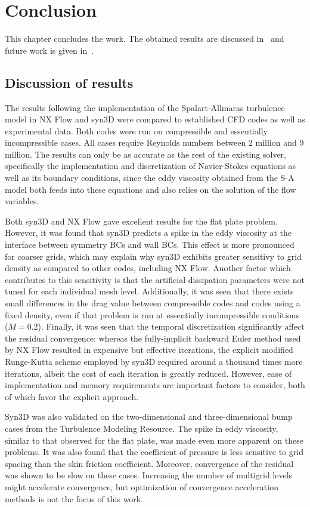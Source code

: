 \chapter{Conclusion}
This chapter concludes the work. The obtained results are discussed in~ and future work is given in~.

\section{Discussion of results}
\label{sec:conclusionresults}
The results following the implementation of the Spalart-Allmaras turbulence model in NX Flow and syn3D were compared to established CFD codes as well as experimental data. Both codes were run on compressible and essentially incompressible cases. All cases require Reynolds numbers between 2 million and 9 million. The results can only be as accurate as the rest of the existing solver, specifically the implementation and discretization of Navier-Stokes equations as well as its boundary conditions, since the eddy viscosity obtained from the S-A model both feeds into these equations and also relies on the solution of the flow variables.

Both syn3D and NX Flow gave excellent results for the flat plate problem. However, it was found that syn3D predicts a spike in the eddy viscosity at the interface between symmetry BCs and wall BCs. This effect is more pronounced for coarser grids, which may explain why syn3D exhibits greater sensitivy to grid density as compared to other codes, including NX Flow. Another factor which contributes to this sensitivity is that the artificial dissipation parameters were not tuned for each individual mesh level. Additionally, it was seen that there exists small differences in the drag value between compressible codes and codes using a fixed density, even if that problem is run at essentially incompressible conditions ($M = 0.2$). Finally, it was seen that the temporal discretization significantly affect the residual convergence: whereas the fully-implicit backward Euler method used by NX Flow resulted in expensive but effective iterations, the explicit modified Runge-Kutta scheme employed by syn3D required around a thousand times more iterations, albeit the cost of each iteration is greatly reduced. However, ease of implementation and memory requirements are important factors to consider, both of which favor the explicit approach.

Syn3D was also validated on the two-dimensional and three-dimensional bump cases from the Turbulence Modeling Resource. The spike in eddy viscosity, similar to that observed for the flat plate, was made even more apparent on these problems. It was also found that the coefficient of pressure is less sensitive to grid spacing than the skin friction coefficient. Moreover, convergence of the residual was shown to be slow on these cases. Increasing the number of multigrid levels might accelerate convergence, but optimization of convergence acceleration methods is not the focus of this work.

